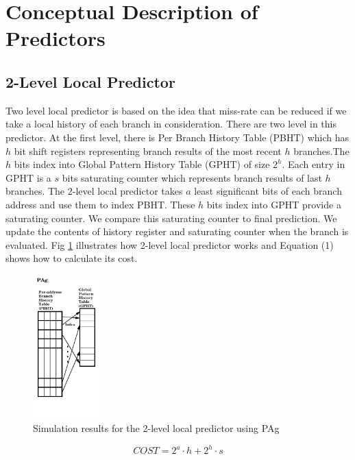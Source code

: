 \documentclass[conference]{IEEEtran}
\begin{document}
\section{Conceptual Description of Predictors}
\subsection{2-Level Local Predictor}
Two level local predictor is based on the idea that miss-rate can be reduced if we take a local history of each branch in consideration. There are two level in this predictor. At the first level, there is Per Branch History Table (PBHT) which has $h$ bit shift registers representing branch results of the most recent $h$ branches.The $h$ bits index into Global Pattern History Table (GPHT) of size $2^{h}$. Each entry in GPHT is a $s$ bits saturating counter which represents branch results of last $h$ branches. The 2-level local predictor takes $a$ least significant bits of each branch address and use them to index PBHT. These $h$ bits index into GPHT provide a saturating counter. We compare this saturating counter to final prediction. We update the contents of history register and saturating counter when the branch is evaluated. Fig \ref{2-level_diagram} illustrates how 2-level local predictor works and Equation (1) shows how to calculate its cost.

    \begin{figure}[!t]
        \centering
        \includegraphics[width=1in]{2-level_diagram}
        \caption{Simulation results for the 2-level local predictor using PAg\cite{twolevel}}
        \label{2-level_diagram}
    \end{figure}
    
    \begin{equation}
    COST = 2^a \cdot h + 2^h \cdot s
    \end{equation}
\end{document}
